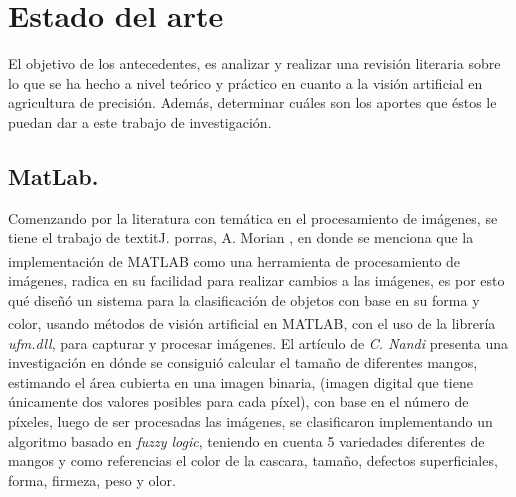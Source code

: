 \chapter{Estado del arte}

	El objetivo de los antecedentes, es analizar y realizar una revisión literaria sobre lo  que  se  ha hecho  a  nivel  teórico  y  práctico  en  cuanto a  la visión artificial en agricultura de precisión.  Además,  determinar  cuáles son los aportes que éstos le puedan dar a este trabajo de investigación.


\section{MatLab.}

	Comenzando por la literatura con temática en el procesamiento de imágenes, se tiene el trabajo de textit{J. porras, A. Morian} \cite{article3}, en donde se menciona que la implementación de MATLAB\textsuperscript{\textregistered} como una herramienta de procesamiento de imágenes, radica en su facilidad para realizar cambios a las imágenes, es por esto qué diseñó un sistema para la clasificación de objetos con base en su forma y color, usando métodos de visión artificial en MATLAB\textsuperscript{\textregistered}, con el uso de la librería \textit{ufm.dll}, para capturar y procesar imágenes. El artículo de \textit{C. Nandi} \cite{inproceedings} presenta una investigación en dónde se consiguió calcular el tamaño de diferentes mangos, estimando el área cubierta en una imagen binaria, (imagen digital que tiene únicamente dos valores posibles para cada píxel), con base en el número de píxeles, luego de ser procesadas las imágenes, se clasificaron implementando un algoritmo basado en \textit{fuzzy logic}, teniendo en cuenta 5 variedades diferentes de mangos y como referencias el color de la cascara, tamaño, defectos superficiales, forma, firmeza, peso y olor.\\

